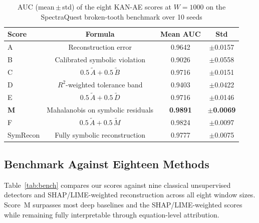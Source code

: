 \documentclass[conference]{IEEEtran}
\begin{document}
\begin{table}[t]
\centering
\caption{AUC (mean\,$\pm$\,std) of the eight KAN-AE scores at $W{=}1000$ on the
SpectraQuest broken-tooth benchmark over 10 seeds}
\label{tab:scores}
\begin{tabular}{lccc}
\toprule
Score & Formula & Mean AUC & Std \\
\midrule
A & Reconstruction error              & 0.9642 & $\pm$0.0157 \\
B & Calibrated symbolic violation     & 0.9026 & $\pm$0.0558 \\
C & $0.5\,\tilde{A}+0.5\,\tilde{B}$  & 0.9716 & $\pm$0.0151 \\
D & $R^2$-weighted tolerance band     & 0.9403 & $\pm$0.0422 \\
E & $0.5\,\tilde{A}+0.5\,\tilde{D}$  & 0.9716 & $\pm$0.0146 \\
\textbf{M} & Mahalanobis on symbolic residuals & \textbf{0.9891} & $\pm$\textbf{0.0069} \\
F & $0.5\,\tilde{A}+0.5\,\tilde{M}$  & 0.9824 & $\pm$0.0097 \\
SymRecon & Fully symbolic reconstruction      & 0.9777 & $\pm$0.0075 \\
\bottomrule
\end{tabular}
\end{table}

\subsection{Benchmark Against Eighteen Methods}
Table~\ref{tab:bench} compares our scores against nine classical
unsupervised detectors and SHAP/LIME-weighted reconstruction across
all eight window sizes. Score~M surpasses most deep baselines and the
SHAP/LIME-weighted scores while remaining fully interpretable through
equation-level attribution.
\end{document}
